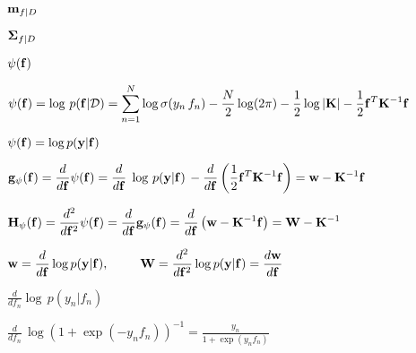 \documentclass{article}
\def\lthtmlcheckvsize{\ifdim\ht\sizebox<\vsize 
  \ifdim\wd\sizebox<\hsize\expandafter\hfill\fi \expandafter\vfill
  \else\expandafter\vss\fi}%
\begin{document}
{\newpage\clearpage
{}%
$ {\bf m}_{f|D}$%
\lthtmlindisplaymathZ
\lthtmlcheckvsize\clearpage}

{\newpage\clearpage
{}%
$ {\bf\Sigma}_{f|D}$%
\lthtmlindisplaymathZ
\lthtmlcheckvsize\clearpage}

{\newpage\clearpage
{}%
$ \psi({\bf f})$%
\lthtmlindisplaymathZ
\lthtmlcheckvsize\clearpage}

{\newpage\clearpage
{}%
$\displaystyle \psi({\bf f})=\log\,p({\bf f}|{\cal D})
=\sum_{n=1}^N\log\sigma(y_n\,f_n)-\frac{N}{2}\log(2\pi)-\frac{1}{2}\log|{\bf K}|
-\frac{1}{2}{\bf f}^T {\bf K}^{-1}{\bf f}$%
\lthtmlindisplaymathZ
\lthtmlcheckvsize\clearpage}

{\newpage\clearpage
{}%
$ \psi({\bf f})=\log p({\bf y}|{\bf f})$%
\lthtmlindisplaymathZ
\lthtmlcheckvsize\clearpage}

{\newpage\clearpage
{}%
$\displaystyle {\bf g}_{\psi}({\bf f})=\frac{d}{d{\bf f}}\psi({\bf f})
=\frac{d}{d{\bf f}}\;\log\,p({\bf y}|{\bf f})\,
-\frac{d}{d{\bf f}}\left(\frac{1}{2} {\bf f}^T{\bf K}^{-1}{\bf f}\right)
={\bf w}-{\bf K}^{-1}{\bf f}$%
\lthtmlindisplaymathZ
\lthtmlcheckvsize\clearpage}

{\newpage\clearpage
{}%
$\displaystyle {\bf H}_{\psi}({\bf f})=\frac{d^2}{d{\bf f}^2}\psi({\bf f})
=\frac{d}{d{\bf f}} {\bf g}_\psi({\bf f})
=\frac{d}{d{\bf f}} \left( {\bf w}-{\bf K}^{-1}{\bf f}\right)
={\bf W}-{\bf K}^{-1}$%
\lthtmlindisplaymathZ
\lthtmlcheckvsize\clearpage}

{\newpage\clearpage
{}%
$\displaystyle {\bf w}=\frac{d}{d{\bf f}}\log p({\bf y}|{\bf f}),
\;\;\;\;\;\;\;\;\;
{\bf W}=\frac{d^2}{d{\bf f}^2} \log p({\bf y}|{\bf f})
=\frac{d{\bf w}}{d{\bf f}}$%
\lthtmlindisplaymathZ
\lthtmlcheckvsize\clearpage}

{\newpage\clearpage
{}%
$\displaystyle \frac{d}{df_n}\log\,p(y_n|f_n)$%
\lthtmlindisplaymathZ
\lthtmlcheckvsize\clearpage}

{\newpage\clearpage
{}%
$\displaystyle \frac{d}{df_n}\,
\log\left(1+\exp(-y_n f_n)\right)^{-1}
=\frac{y_n}{1+\exp(y_n f_n)}$%
\lthtmlindisplaymathZ
\lthtmlcheckvsize\clearpage}
\end{document}

